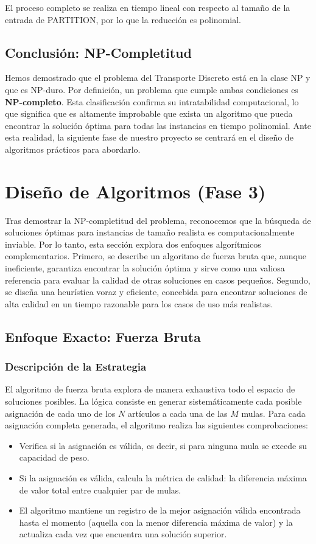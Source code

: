 \documentclass[12pt, a4paper]{article}
\begin{document}
    El proceso completo se realiza en tiempo lineal con respecto al tamaño de la entrada de PARTITION, por lo que la reducción es polinomial.

    \subsection{Conclusión: NP-Completitud}
    Hemos demostrado que el problema del Transporte Discreto está en la clase NP y que es NP-duro. Por definición, un problema que cumple ambas condiciones es \textbf{NP-completo}. Esta clasificación confirma su intratabilidad computacional, lo que significa que es altamente improbable que exista un algoritmo que pueda encontrar la solución óptima para todas las instancias en tiempo polinomial. Ante esta realidad, la siguiente fase de nuestro proyecto se centrará en el diseño de algoritmos prácticos para abordarlo.

    \section{Diseño de Algoritmos (Fase 3)}
    Tras demostrar la NP-completitud del problema, reconocemos que la búsqueda de soluciones óptimas para instancias de tamaño realista es computacionalmente inviable. Por lo tanto, esta sección explora dos enfoques algorítmicos complementarios. Primero, se describe un algoritmo de fuerza bruta que, aunque ineficiente, garantiza encontrar la solución óptima y sirve como una valiosa referencia para evaluar la calidad de otras soluciones en casos pequeños. Segundo, se diseña una heurística voraz y eficiente, concebida para encontrar soluciones de alta calidad en un tiempo razonable para los casos de uso más realistas.

    \subsection{Enfoque Exacto: Fuerza Bruta}
    \subsubsection{Descripción de la Estrategia}
    El algoritmo de fuerza bruta explora de manera exhaustiva todo el espacio de soluciones posibles. La lógica consiste en generar sistemáticamente cada posible asignación de cada uno de los $N$ artículos a cada una de las $M$ mulas. Para cada asignación completa generada, el algoritmo realiza las siguientes comprobaciones:
    \begin{itemize}
        \item Verifica si la asignación es válida, es decir, si para ninguna mula se excede su capacidad de peso.
        \item Si la asignación es válida, calcula la métrica de calidad: la diferencia máxima de valor total entre cualquier par de mulas.
        \item El algoritmo mantiene un registro de la mejor asignación válida encontrada hasta el momento (aquella con la menor diferencia máxima de valor) y la actualiza cada vez que encuentra una solución superior.
    \end{itemize}
\end{document}
